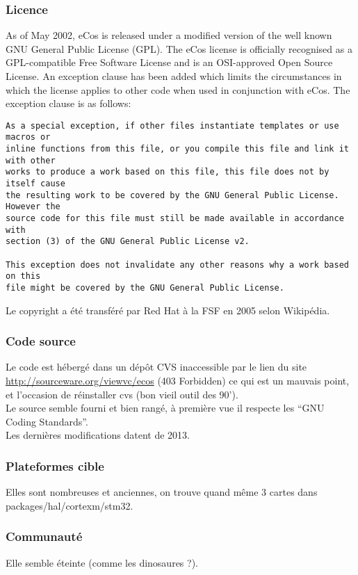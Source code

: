 \subsubsection{Licence}
As of May 2002, eCos is released under a modified version of the well known GNU
General Public License (GPL). The eCos license is officially recognised as a
GPL-compatible Free Software License and is an OSI-approved Open Source License. An
exception clause has been added which limits the circumstances in which the license
applies to other code when used in conjunction with eCos. The exception clause is as
follows:
\begin{verbatim}
As a special exception, if other files instantiate templates or use macros or
inline functions from this file, or you compile this file and link it with other
works to produce a work based on this file, this file does not by itself cause
the resulting work to be covered by the GNU General Public License. However the
source code for this file must still be made available in accordance with
section (3) of the GNU General Public License v2.

This exception does not invalidate any other reasons why a work based on this
file might be covered by the GNU General Public License.
\end{verbatim}

Le copyright a été transféré par Red Hat à la FSF en 2005 selon Wikipédia.

\subsubsection{Code source}
Le code est hébergé dans un dépôt CVS inaccessible par le lien du site
\url{http://sourceware.org/viewvc/ecos} (403 Forbidden) ce qui est un mauvais point,
et l'occasion de réinstaller cvs (bon vieil outil des 90').\\

Le source semble fourni et bien rangé, à première vue il respecte les \enquote{GNU
Coding Standards}\cite{ref4}.\\

Les dernières modifications datent de 2013.

\subsubsection{Plateformes cible}
Elles sont nombreuses et anciennes, on trouve quand même 3 cartes dans
packages/hal/cortexm/stm32.

\subsubsection{Communauté}
Elle semble éteinte (comme les dinosaures ?).\\

